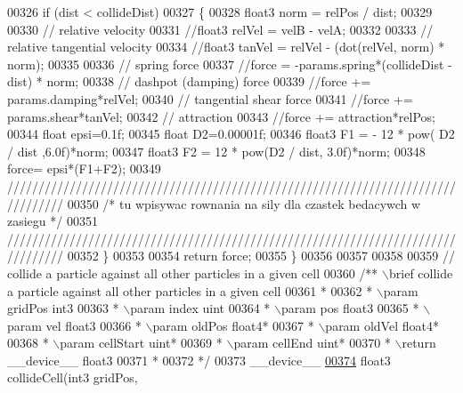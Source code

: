 \begin{DoxyCode}
00326     \textcolor{keywordflow}{if} (dist < collideDist)
00327     \{
00328         float3 norm = relPos / dist;
00329 
00330         \textcolor{comment}{// relative velocity}
00331         \textcolor{comment}{//float3 relVel = velB - velA;}
00332 
00333         \textcolor{comment}{// relative tangential velocity}
00334         \textcolor{comment}{//float3 tanVel = relVel - (dot(relVel, norm) * norm);}
00335 
00336         \textcolor{comment}{// spring force}
00337         \textcolor{comment}{//force = -params.spring*(collideDist - dist) * norm;}
00338         \textcolor{comment}{// dashpot (damping) force}
00339         \textcolor{comment}{//force += params.damping*relVel;}
00340         \textcolor{comment}{// tangential shear force}
00341         \textcolor{comment}{//force += params.shear*tanVel;}
00342         \textcolor{comment}{// attraction}
00343         \textcolor{comment}{//force += attraction*relPos;}
00344                 \textcolor{keywordtype}{float} epsi=0.1f;
00345                 \textcolor{keywordtype}{float} D2=0.00001f;
00346                 float3 F1 = - 12 * pow( D2 /  dist ,6.0f)*norm;
00347                 float3 F2 = 12 * pow(D2 / dist, 3.0f)*norm;
00348                 force= epsi*(F1+F2);
00349 \textcolor{comment}{/////////////////////////////////////////////////////////////////////////////////}
00350 \textcolor{comment}{/*      tu wpisywac rownania na sily dla czastek bedacywch w zasiegu    */}
00351 \textcolor{comment}{/////////////////////////////////////////////////////////////////////////////////}
00352     \}
00353 
00354     \textcolor{keywordflow}{return} force;
00355 \}
00356 
00357 
00358 
00359 \textcolor{comment}{// collide a particle against all other particles in a given cell}
00360 \textcolor{comment}{/** \(\backslash\)brief collide a particle against all other particles in a given cell}
00361 \textcolor{comment}{ *}
00362 \textcolor{comment}{ * \(\backslash\)param gridPos int3}
00363 \textcolor{comment}{ * \(\backslash\)param index uint}
00364 \textcolor{comment}{ * \(\backslash\)param pos float3}
00365 \textcolor{comment}{ * \(\backslash\)param vel float3}
00366 \textcolor{comment}{ * \(\backslash\)param oldPos float4*}
00367 \textcolor{comment}{ * \(\backslash\)param oldVel float4*}
00368 \textcolor{comment}{ * \(\backslash\)param cellStart uint*}
00369 \textcolor{comment}{ * \(\backslash\)param cellEnd uint*}
00370 \textcolor{comment}{ * \(\backslash\)return \_\_device\_\_ float3}
00371 \textcolor{comment}{ *}
00372 \textcolor{comment}{ */}
00373 \_\_device\_\_
\hypertarget{particles__kernel__impl_8cuh_source_l00374}{}\hyperlink{particles__kernel__impl_8cuh_a8e623e11d4ac873cfbe9d7c916326363}{00374} float3 collideCell(int3    gridPos,

\end{DoxyCode}

